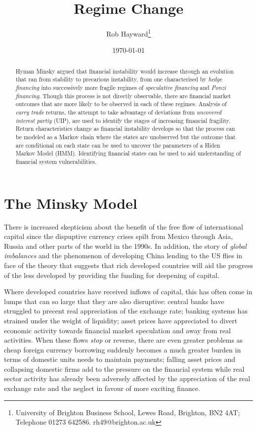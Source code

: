 \documentclass[12pt, a4paper, oneside]{article} %
\begin{document}
\title{Regime Change}
\author{Rob Hayward\footnote{University of Brighton Business School, Lewes Road, Brighton, BN2 4AT; Telephone 01273 642586.  rh49@brighton.ac.uk}} 
\date{\today}
\maketitle
\begin{abstract}
Hyman Minsky argued that financial instability would increase through an evolution that ran from stability to precarious instability, from one characterised by \emph{hedge financing} into successively more fragile regimes of \emph{speculative financing} and \emph{Ponzi financing}.  Though this process is not directly observable, there are financial market outcomes that are more likely to be observed in each of these regimes.  Analysis of \emph{carry trade} returns, the attempt to take advantage of deviations from \emph{uncovered interest partiy} (UIP), are used to identify the stages of increasing financial fragility.  Return characteristics change as financial instability develops so that the process can be modeled as a Markov chain where the states are unobserved but the outcome that are conditional on each state can be used to uncover the parameters of a Hiden Markov Model (HMM).   Identifying financial states can be used to aid understanding of financial system vulnerabilities. 

\end{abstract}

\section{The Minsky Model}
There is increased skepticism about the benefit of the free flow of international capital since the dispuptive currency crises spilt from Mexico through Asia, Russia and other parts of the world in the 1990s.  In addition, the story of \emph{global imbalances} and the phenomenon of developing China lending to the US flies in face of the theory that suggests that rich developed countries will aid the progress of the less developed by providing the funding for deepening of capital.  

Where developed countries have received inflows of capital, this has often come in lumps that can so large that they are also disruptive: central banks have struggled to precent real appreciation of the exchange rate; banking systems has strained under the weight of liquidity; asset prices have appreciated to divert economic activity towards financial market speculation and away from real activities.  When these flows \emph{stop} or reverse, there are even greater problems as cheap foreign currency borrowing suddenly becomes a much greater burden in terms of domestic units needs to maintain payments; falling asset prices and collapsing domestic firms add to the pressure on the financial system while real sector activity has already been adversely affected by the appreciation of the real exchange rate and the neglect in favour of more exciting finance. 
\end{document}
